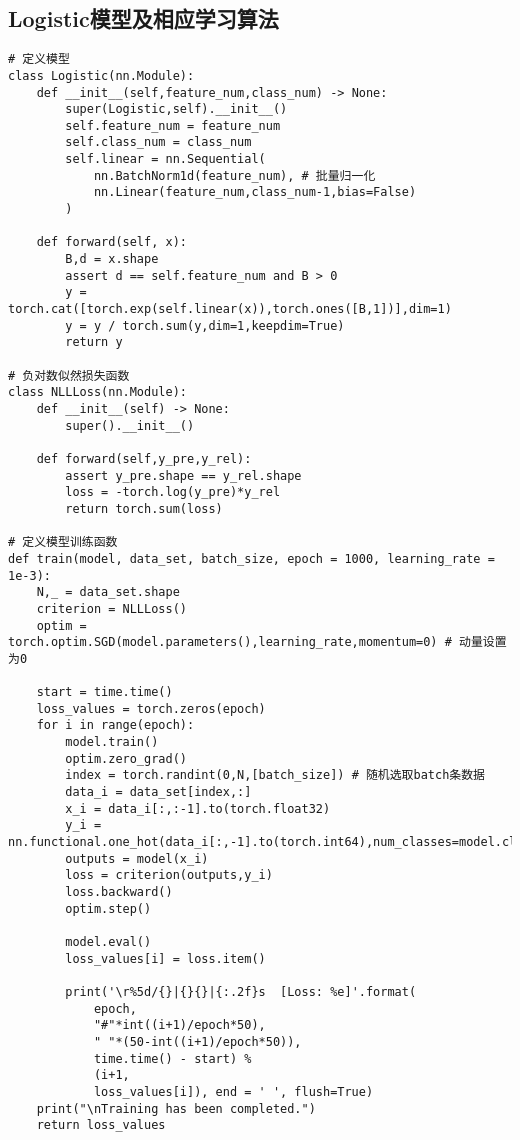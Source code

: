 \subsection{Logistic模型及相应学习算法}
\begin{lstlisting}[caption={逻辑斯谛回归模型及损失函数和训练方法}]
# 定义模型
class Logistic(nn.Module):
    def __init__(self,feature_num,class_num) -> None:
        super(Logistic,self).__init__()
        self.feature_num = feature_num
        self.class_num = class_num
        self.linear = nn.Sequential(
            nn.BatchNorm1d(feature_num), # 批量归一化
            nn.Linear(feature_num,class_num-1,bias=False)
        )

    def forward(self, x):
        B,d = x.shape
        assert d == self.feature_num and B > 0
        y = torch.cat([torch.exp(self.linear(x)),torch.ones([B,1])],dim=1)
        y = y / torch.sum(y,dim=1,keepdim=True)
        return y
    
# 负对数似然损失函数
class NLLLoss(nn.Module):
    def __init__(self) -> None:
        super().__init__()
    
    def forward(self,y_pre,y_rel):
        assert y_pre.shape == y_rel.shape
        loss = -torch.log(y_pre)*y_rel
        return torch.sum(loss)

# 定义模型训练函数
def train(model, data_set, batch_size, epoch = 1000, learning_rate = 1e-3):
    N,_ = data_set.shape
    criterion = NLLLoss()
    optim = torch.optim.SGD(model.parameters(),learning_rate,momentum=0) # 动量设置为0
    
    start = time.time()
    loss_values = torch.zeros(epoch)
    for i in range(epoch):
        model.train()
        optim.zero_grad()
        index = torch.randint(0,N,[batch_size]) # 随机选取batch条数据
        data_i = data_set[index,:]
        x_i = data_i[:,:-1].to(torch.float32)
        y_i = nn.functional.one_hot(data_i[:,-1].to(torch.int64),num_classes=model.class_num)
        outputs = model(x_i)
        loss = criterion(outputs,y_i)
        loss.backward()
        optim.step()

        model.eval()
        loss_values[i] = loss.item()

        print('\r%5d/{}|{}{}|{:.2f}s  [Loss: %e]'.format(
            epoch,
            "#"*int((i+1)/epoch*50),
            " "*(50-int((i+1)/epoch*50)),
            time.time() - start) %
            (i+1,
            loss_values[i]), end = ' ', flush=True)
    print("\nTraining has been completed.")
    return loss_values
\end{lstlisting}


